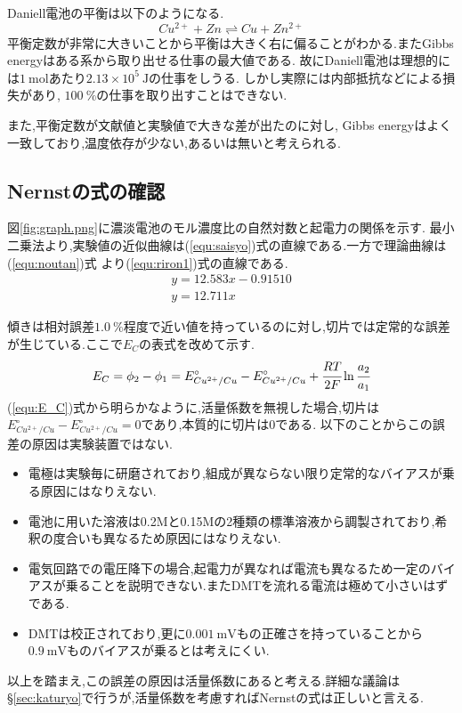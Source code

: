 Daniell電池の平衡は以下のようになる.
\begin{equation}
  \label{equ:daniellheiko}
  Cu^{2+}+Zn \rightleftharpoons Cu+Zn^{2+}
\end{equation}
平衡定数が非常に大きいことから平衡は大きく右に偏ることがわかる.またGibbs energyはある系から取り出せる仕事の最大値である\cite{kagakunetu}.
故にDaniell電池は理想的には$1\ \si{\mole}$あたり$2.13\times10^5\ \si{\joule}$の仕事をしうる.
しかし実際には内部抵抗などによる損失があり, $100\ \%$の仕事を取り出すことはできない.

また,平衡定数が文献値と実験値で大きな差が出たのに対し, Gibbs energyはよく一致しており,温度依存が少ない,あるいは無いと考えられる.
\subsection{Nernstの式の確認}
\label{sec:Nernst}
図\ref{fig:graph.png}に濃淡電池のモル濃度比の自然対数と起電力の関係を示す.
最小二乗法より,実験値の近似曲線は(\ref{equ:saisyo})式の直線である.一方で理論曲線は(\ref{equ:noutan})式
より(\ref{equ:riron1})式の直線である.
\begin{align}
  \label{equ:saisyo}
  y=12.583x-0.91510\\
  \label{equ:riron1}
  y=12.711x
\end{align}

傾きは相対誤差$1.0\ \%$程度で近い値を持っているのに対し,切片では定常的な誤差が生じている.ここで$E_C$の表式を改めて示す.
\begin{equation}
  \label{equ:E_C}
  E_C=\phi_2-\phi_1=E^{\circ}_{Cu^{2+}/Cu}-E^{\circ}_{Cu^{2+}/Cu}+\cfrac{RT}{2F}\ln \cfrac{a_2}{a_1}
\end{equation}
(\ref{equ:E_C})式から明らかなように,活量係数を無視した場合,切片は$E^{\circ}_{Cu^{2+}/Cu}-E^{\circ}_{Cu^{2+}/Cu}=0$であり,本質的に切片は0である.
以下のことからこの誤差の原因は実験装置ではない.
\begin{itemize}
  \item 電極は実験毎に研磨されており,組成が異ならない限り定常的なバイアスが乗る原因にはなりえない.
  \item 電池に用いた溶液は0.2Mと0.15Mの2種類の標準溶液から調製されており,希釈の度合いも異なるため原因にはなりえない.
  \item 電気回路での電圧降下の場合,起電力が異なれば電流も異なるため一定のバイアスが乗ることを説明できない.またDMTを流れる電流は極めて小さいはずである.
  \item DMTは校正されており,更に$0.001\ \si{\milli\volt}$もの正確さを持っていることから$0.9\ \si{\milli\volt}$ものバイアスが乗るとは考えにくい.
\end{itemize}
以上を踏まえ,この誤差の原因は活量係数にあると考える.詳細な議論は\S\ref{sec:katuryo}で行うが,活量係数を考慮すればNernstの式は正しいと言える.
